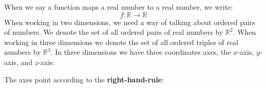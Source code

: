 \documentclass{ximera}
\begin{document}
When we say a function maps a real number to a real number, we write:
\[
f:\mathbb{R} \to \mathbb{R}
\]
When working in two dimensions, we need a way of talking about ordered
pairs of numbers. We denote the set of all ordered pairs of real
numbers by $\mathbb{R}^2$. When working in three dimensions we denote the set
of all ordered triples of real numbers by $\mathbb{R}^3$.  In three dimensions
we have three coordinates axes, the $x$-axis, $y$-axis, and $z$-axis:
\begin{image}[1in]
\end{image}
The axes point according to the \textbf{right-hand-rule}:
\end{document}
